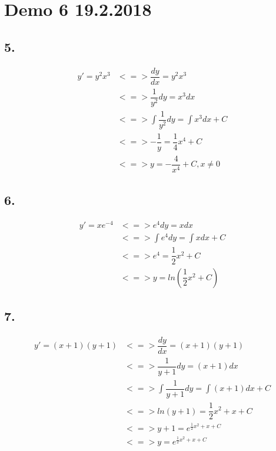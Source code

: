 \section{Demo 6 19.2.2018}


\subsection{5.}
\begin{center}
\begin{align*}
	y' = y^2 x^3 &<=> \dfrac{dy}{dx} = y^2 x^3 \\
				&<=> \dfrac{1}{y^2} dy = x^3 dx \\
				&<=> \int \dfrac{1}{y^2} dy = \int x^3 dx + C \\
				&<=> - \dfrac{1}{y} = \dfrac{1}{4} x^4 + C \\
				&<=> y = - \dfrac{4}{x^4} + C , x \neq 0
\end{align*}
\end{center}


\subsection{6.}
\begin{center}
\begin{align*}
	y' = xe^{-4} 	&<=> e^4 dy = x dx \\
					&<=> \int e^4 dy = \int xdx + C \\
					&<=> e^4 = \dfrac{1}{2}x^2 + C \\
					&<=> y = ln(\dfrac{1}{2}x^2 + C)
\end{align*}
\end{center}

\subsection{7.}
\begin{center}
\begin{align*}
	y' = (x + 1)(y + 1) &<=> \dfrac{dy}{dx} = (x + 1)(y + 1) \\
						&<=> \dfrac{1}{y+1} dy = (x+1) dx \\
						&<=> \int \dfrac{1}{y+1}dy = \int (x+1) dx + C \\
						&<=> ln(y+1) = \dfrac{1}{2}x^2 + x + C \\
						&<=> y+1 = e^{\frac{1}{2} x^2 + x + C} \\
						&<=> y = e^{\frac{1}{2} x^2 + x + C}
\end{align*}
\end{center}
